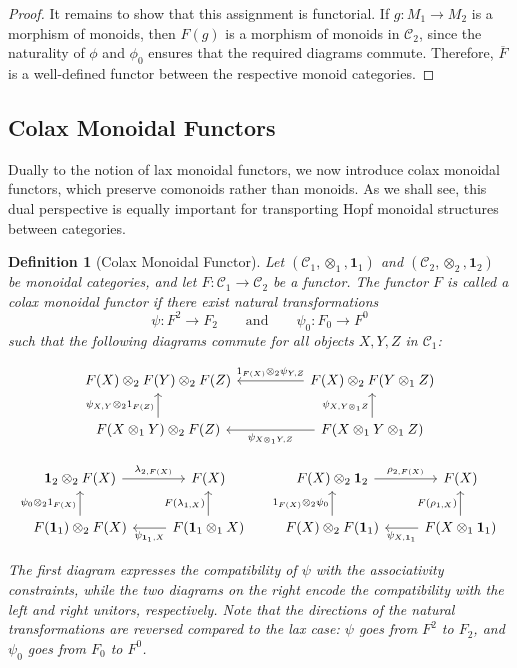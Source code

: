 \documentclass{amsart}
\newtheorem{definition}{Definition}[section]
\begin{document}
\begin{proof}
It remains to show that this assignment is functorial. If $g \colon M_1 \to M_2$ is a morphism of monoids, then $F(g)$ is a morphism of monoids in $\mathcal{C}_2$, since the naturality of $\phi$ and $\phi_0$ ensures that the required diagrams commute. Therefore, $\overline{F}$ is a well-defined functor between the respective monoid categories.
\end{proof}
\subsection{Colax Monoidal Functors}

Dually to the notion of lax monoidal functors, we now introduce colax monoidal functors, which preserve comonoids rather than monoids. As we shall see, this dual perspective is equally important for transporting Hopf monoidal structures between categories.

\begin{definition}[Colax Monoidal Functor]\label{def:colax_monoidal}
Let $(\mathcal{C}_1, \otimes_1, \mathbf{1}_1)$ and $(\mathcal{C}_2, \otimes_2, \mathbf{1}_2)$ be monoidal categories, and let $F \colon \mathcal{C}_1 \longrightarrow \mathcal{C}_2$ be a functor. The functor $F$ is called a colax monoidal functor if there exist natural transformations
\[
\psi \colon F^2 \longrightarrow F_2 \qquad\text{and}\qquad \psi_0 \colon F_0 \longrightarrow F^0
\]
such that the following diagrams commute for all objects $X, Y, Z$ in $\mathcal{C}_1$:

\[
\begin{tikzcd}
F(X)\otimes_2F(Y)\otimes_2F(Z)&&F(X)\otimes_2 F(Y\otimes_1 Z)\arrow[swap]{ll}{1_{F(X)}\otimes_2\psi_{Y,Z}}\\
F(X\otimes_1 Y)\otimes_2 F(Z)\arrow{u}{\psi_{X,Y}\otimes_2 1_{F(Z)}}&&F(X\otimes_1 Y\otimes_1 Z)\arrow{u}{\psi_{X,Y\otimes_1 Z}}\arrow{ll}{\psi_{X\otimes_1 Y,Z}}
\end{tikzcd}
\label{eq:colax_associativity}
\]

\[
\begin{tikzcd}
\mathbf{1}_2\otimes_2F(X)\arrow{r}{\lambda_{2,F(X)}}&F(X)\\
F(\mathbf{1}_1)\otimes_2F(X)\arrow{u}{\psi_0\otimes_2 1_{F(X)}}&F(\mathbf{1}_1\otimes_1 X)\arrow{u}{F(\lambda_{1,X})}\arrow{l}{\psi_{\mathbf{1}_1,X}}
\end{tikzcd}
\;\;\;\;\;
\begin{tikzcd}
F(X)\otimes_2\mathbf{1}_2\arrow{r}{\rho_{2,F(X)}}&F(X)\\
F(X)\otimes_2F(\mathbf{1}_1)\arrow{u}{1_{F(X)}\otimes_2 \psi_0}&F(X\otimes_1 \mathbf{1}_1)\arrow{u}{F(\rho_{1,X})}\arrow{l}{\psi_{X,\mathbf{1}_1}}
\end{tikzcd}
\label{eq:colax_unit}
\]

The first diagram expresses the compatibility of $\psi$ with the associativity constraints, while the two diagrams on the right encode the compatibility with the left and right unitors, respectively. Note that the directions of the natural transformations are reversed compared to the lax case: $\psi$ goes from $F^2$ to $F_2$, and $\psi_0$ goes from $F_0$ to $F^0$.
\end{definition}
\end{document}
